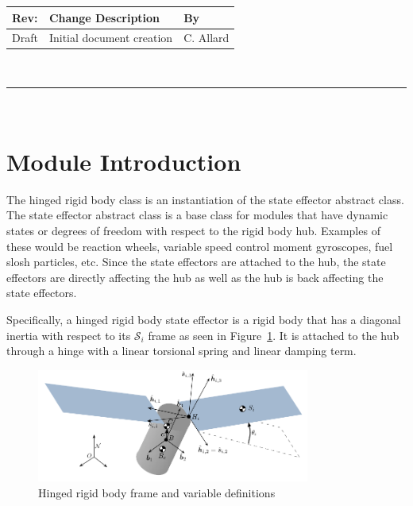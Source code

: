 \documentclass[]{BasiliskReportMemo}
\begin{document}
\makeCover
%
%
\pagestyle{empty}
{\renewcommand{\arraystretch}{1.1}
\noindent
\begin{longtable}{|p{0.5in}|p{4.5in}|p{1.14in}|}
\hline
{\bfseries Rev}: & {\bfseries Change Description} & {\bfseries By} \\
\hline
Draft & Initial document creation & C. Allard \\
\hline

\end{longtable}
}

\newpage
\setcounter{page}{1}
\pagestyle{fancy}

\tableofcontents
~\\ \hrule ~\\



\section{Module Introduction}
The hinged rigid body class is an instantiation of the state effector abstract class. The state effector abstract class is a base class for modules that have dynamic states or degrees of freedom with respect to the rigid body hub. Examples of these would be reaction wheels, variable speed control moment gyroscopes, fuel slosh particles, etc. Since the state effectors are attached to the hub, the state effectors are directly affecting the hub as well as the hub is back affecting the state effectors.

Specifically, a hinged rigid body state effector is a rigid body that has a diagonal inertia with respect to its $\mathcal{S}_i$ frame as seen in Figure~\ref{fig:FlexFigure}. It is attached to the hub through a hinge with a linear torsional spring and linear damping term. 

\begin{figure}[htbp]
	\centerline{
		\includegraphics[width=0.8\textwidth]{Figures/Fig4_4_2}}
	\caption{Hinged rigid body frame and variable definitions}
	\label{fig:FlexFigure}
\end{figure}
\end{document}
